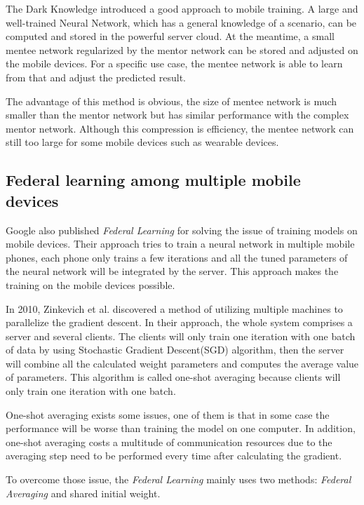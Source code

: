 \documentclass[article]{aaltoseries}
\begin{document}
The Dark Knowledge introduced a good approach to mobile training. 
A large and well-trained Neural Network, which has a general knowledge of a scenario, can be computed and stored in the powerful server cloud.
At the meantime, a small mentee network regularized by the mentor network can be stored and adjusted on the mobile devices.
For a specific use case, the mentee network is able to learn from that and adjust the predicted result. 



The advantage of this method is obvious, 
the size of mentee network is much smaller than the mentor network but has similar performance
with the complex mentor network. 
Although this compression is efficiency, the mentee network can still too large for some mobile
devices such as wearable devices.


\subsection{Federal learning among multiple mobile devices}

Google also published \emph{Federal Learning} for solving the issue of training models on mobile devices.
Their approach tries to train a neural network in multiple mobile phones, each phone only trains a few iterations
and all the tuned parameters of the neural network will be integrated by the server. 
This approach makes the training on the mobile devices possible.

In 2010, Zinkevich et al.\cite{Zinkevich2010} discovered a method of utilizing multiple machines to parallelize the gradient descent.
In their approach, the whole system comprises a server and several clients. 
The clients will only train one iteration with one batch of data by using Stochastic Gradient Descent(SGD) algorithm, 
then the server will combine all the calculated weight parameters and computes the average value of parameters.
This algorithm is called one-shot averaging because clients will only train one iteration with one batch.

One-shot averaging exists some issues, one of them is that in some case the performance will be worse than training
the model on one computer\cite{Shamir2013}. In addition, one-shot averaging costs a multitude of communication resources
due to the averaging step need to be performed every time after calculating the gradient.


To overcome those issue, the \emph{Federal Learning} mainly uses two methods: \emph{Federal Averaging} 
and shared initial weight.
\end{document}
